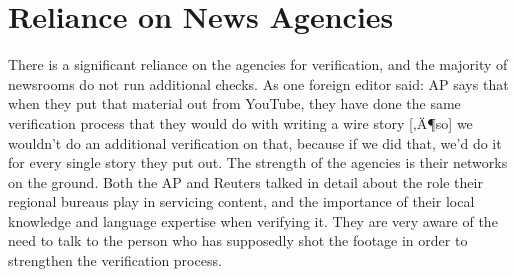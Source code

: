 \documentclass[symmetric, notoc, nobib]{towcenter-book}
\begin{document}
\section{Reliance on News Agencies}
There is a significant reliance on the agencies for verification, and the majority
of newsrooms do not run additional checks. As one foreign editor said:
AP says that when they put that material out from YouTube, they
have done the same verification process that they would do with
writing a wire story [‚Ä¶so] we wouldn't do an additional verification
on that, because if we did that, we'd do it for every single story they
put out.
The strength of the agencies is their networks on the ground. Both the AP
and Reuters talked in detail about the role their regional bureaus play in
servicing content, and the importance of their local knowledge and language
expertise when verifying it. They are very aware of the need to talk to
the person who has supposedly shot the footage in order to strengthen the
verification process.
\end{document}
